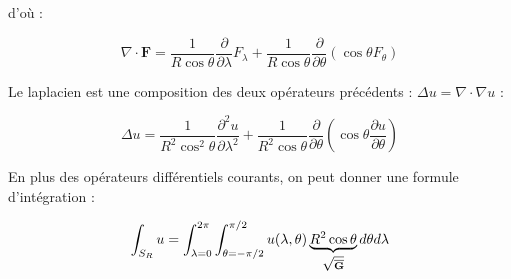 d'où :

\begin{equation}\label{divergence_lonlat}
\nabla \cdot \mathbf{F} = \dfrac{1}{R \cos \theta} \dfrac{\partial}{\partial \lambda}  F_{\lambda} + \dfrac{1}{R \cos \theta} \dfrac{\partial}{\partial \theta} \left( \cos \theta F_{\theta} \right)
\end{equation}

Le laplacien est une composition des deux opérateurs précédents : $\Delta u = \nabla \cdot \nabla u$ :

\begin{equation}\label{laplacien_lonlat}
\Delta u = \dfrac{1}{R^2 \cos^2 \theta} \dfrac{\partial^2 u }{\partial \lambda^2} + \dfrac{1}{R^2 \cos \theta} \dfrac{\partial}{\partial \theta} \left( \cos \theta \dfrac{\partial u}{\partial \theta} \right)
\end{equation}

En plus des opérateurs différentiels courants, on peut donner une formule d'intégration :

\begin{equation}\label{integrale_lonlat}
\displaystyle\int_{S_R} u = \displaystyle\int_{\lambda=0}^{2 \pi} \displaystyle\int_{\theta = - \pi/2}^{\pi/2} u(\lambda, \theta) \underbrace{R^2 \cos \theta}_{\sqrt{\overline{\mathbf{G}}}} d \theta d \lambda
\end{equation}
